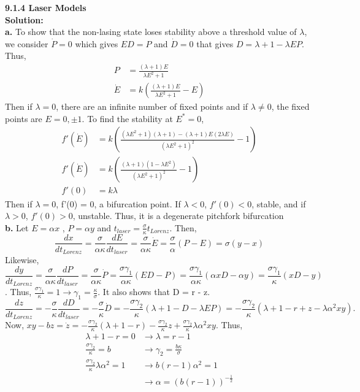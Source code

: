 \documentclass[12pt]{article}
\begin{document}
	{\bf 9.1.4 Laser Models}\\
	{\bf Solution: } \\
	\indent
	{\bf a. } To show that the non-lasing state loses stability above a threshold value of $\lambda$, we consider $\dot{P}=0$ which gives $ED=P$ and $\dot{D}=0$ that gives $D=\lambda+1-\lambda EP.$ Thus,
	\begin{align*}
	P&=\frac{(\lambda+1)E}{\lambda E^2+1}\\
	\dot{E}&=k(\frac{(\lambda+1)E}{\lambda E^2+1}-E)
	\end{align*}
	Then if $\lambda = 0$, there are an infinite number of fixed points and if $\lambda \neq 0$, the fixed points are $E = 0, \pm 1$. To find the stability at $E^* = 0$,\\
	\begin{align*}
	f'(\dot{E}) &= k(\frac{(\lambda E^2 + 1)(\lambda + 1) - (\lambda +1)E(2\lambda E)}{(\lambda E^2 + 1)^2}-1)\\
	f'(\dot{E}) &= k(\frac{(\lambda + 1)(1 - \lambda E^2)}{(\lambda E^2 + 1)^2}-1)\\
	f'(0) &= k\lambda
	\end{align*}
	Then if $\lambda = 0$, f'(0) = 0, a bifurcation point. If $\lambda < 0$, $f'(0) < 0$, stable, and if $\lambda > 0$, $f'(0) > 0$, unstable. Thus, it is a degenerate pitchfork bifurcation \\
	\indent
	{\bf b. } Let $E=\alpha x$ , $P = \alpha y$ and $t_{laser} = \frac{\sigma}{\kappa}t_{Lorenz}$. Then,
	$$\frac{dx}{dt_{Lorenz}} = \frac{\sigma}{\alpha \kappa} \frac{dE}{dt_{laser}} = \frac{\sigma}{\alpha \kappa} \dot{E} =\frac{\sigma}{\alpha} (P - E) = \sigma(y-x)$$ 
	Likewise,
	$$\frac{dy}{dt_{Lorenz}} = \frac{\sigma}{\alpha \kappa} \frac{dP}{dt_{laser}} = \frac{\sigma}{\alpha \kappa} \dot{P} =\frac{\sigma \gamma_1}{\alpha \kappa} (ED - P) = \frac{\sigma \gamma_1}{\alpha \kappa} (\alpha xD - \alpha y) = \frac{\sigma \gamma_1}{\kappa}(xD - y)$$. 
	Thus, $\frac{\sigma \gamma_1}{\kappa} = 1 \rightarrow \gamma_1 = \frac{\kappa}{\sigma}$. It also shows that D = r - z.
	$$\frac{dz}{dt_{Lorenz}} = -\frac{\sigma}{\kappa} \frac{dD}{dt_{laser}} = -\frac{\sigma}{\kappa}\dot{D} = -\frac{\sigma \gamma_2}{\kappa}(\lambda + 1 - D - \lambda EP) = -\frac{\sigma \gamma_2}{\kappa} (\lambda + 1 - r + z - \lambda \alpha ^2xy).$$
	Now, $xy - bz = \dot{z} = -\frac{\sigma \gamma_2}{\kappa} (\lambda + 1 - r) -\frac{\sigma \gamma_2}{\kappa} z + \frac{\sigma \gamma_2}{\kappa} \lambda \alpha ^2xy$. 
	Thus,
	\begin{align*}
	\lambda + 1 - r = 0 &\rightarrow \lambda = r-1\\
	\frac{\sigma \gamma_2}{\kappa} = b &\rightarrow \gamma_2 = \frac{b \kappa}{\sigma}\\
	\frac{\sigma \gamma_2}{\kappa} \lambda \alpha ^2 = 1 &\rightarrow b(r-1)\alpha ^2 = 1\\
	&\rightarrow \alpha = (b(r-1))^{-\frac{1}{2}}
	\end{align*}
\end{document}
